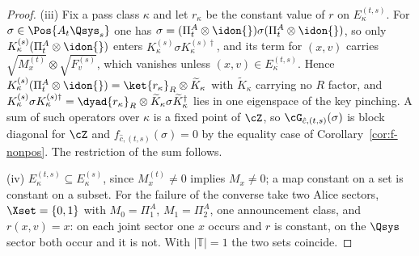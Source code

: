 \begin{proof}
(iii) Fix a pass class $\kappa$ and let $r_{\kappa}$ be the constant value
of $r$ on $E^{(t,s)}_{\kappa}$. For $\sigma\in\Pos{A_t\Qsys_s}$ one has
$\sigma=(\Pi^{A}_t\otimes\idon{})\sigma(\Pi^{A}_t\otimes\idon{})$, so only
$K^{(s)}_{\kappa}(\Pi^{A}_t\otimes\idon{})$ enters
$K^{(s)}_{\kappa}\sigma K^{(s)\dagger}_{\kappa}$, and its term for $(x,v)$
carries $\sqrt{M^{(t)}_x}\otimes\sqrt{F^{(s)}_v}$, which vanishes unless
$(x,v)\in E^{(t,s)}_{\kappa}$. Hence
$K^{(s)}_{\kappa}(\Pi^{A}_t\otimes\idon{})
=\ket{r_{\kappa}}_R\otimes\widetilde K_{\kappa}$ with $\widetilde K_{\kappa}$
carrying no $R$ factor, and
$K^{(s)}_{\kappa}\sigma K^{(s)\dagger}_{\kappa}
=\dyad{r_{\kappa}}_R\otimes\widetilde K_{\kappa}\sigma
\widetilde K_{\kappa}^{\dagger}$ lies in one eigenspace of the key pinching.
A sum of such operators over $\kappa$ is a fixed point of $\cZ$, so
$\cG_{\hat c,(t,s)}(\sigma)$ is block diagonal for $\cZ$ and
$f_{\hat c,(t,s)}(\sigma)=0$ by the equality case of
Corollary~\ref{cor:f-nonpos}. The restriction of the sum follows.

(iv) $E^{(t,s)}_{\kappa}\subseteq E^{(s)}_{\kappa}$, since $M^{(t)}_x\ne0$
implies $M_x\ne0$; a map constant on a set is constant on a subset. For the
failure of the converse take two Alice sectors, $\Xset=\{0,1\}$ with
$M_0=\Pi^{A}_{1}$, $M_1=\Pi^{A}_{2}$, one announcement class, and
$r(x,v)=x$: on each joint sector one $x$ occurs and $r$ is constant, on the
$\Qsys$ sector both occur and it is not. With $|\mathbb{T}|=1$ the two sets
coincide.
\end{proof}
